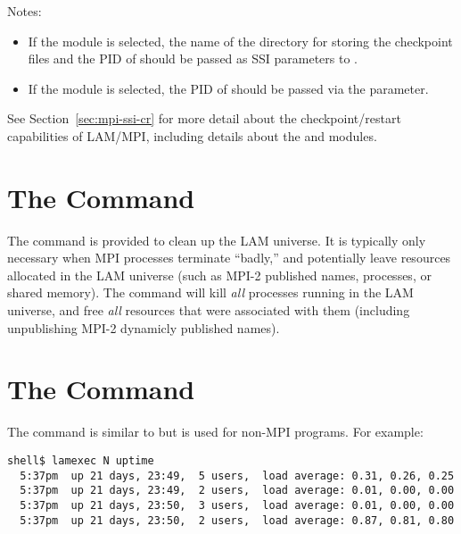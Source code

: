 \noindent Notes:

\begin{itemize}
\item If the   module is selected, the name of
  the directory for storing the checkpoint files and the PID of
   should be passed as SSI parameters to
  .
  
\item If the   module is selected, the PID of
   should be passed via the  parameter.
\end{itemize}


See Section~\ref{sec:mpi-ssi-cr} for more detail about the
checkpoint/restart capabilities of LAM/MPI, including details about
the  and   modules.


\section{The  Command}
\label{sec:commands-lamclean}

The  command is provided to clean up the LAM universe.
It is typically only necessary when MPI processes terminate ``badly,''
and potentially leave resources allocated in the LAM universe (such as
MPI-2 published names, processes, or shared memory).  The
 command will kill {\em all} processes running in the
LAM universe, and free {\em all} resources that were associated with
them (including unpublishing MPI-2 dynamicly published names).


\section{The  Command}
\label{sec:commands-lamexec}

The  command is similar to  but is used for
non-MPI programs.  For example:

\lstset{style=lam-cmdline}
\begin{lstlisting}
shell$ lamexec N uptime
  5:37pm  up 21 days, 23:49,  5 users,  load average: 0.31, 0.26, 0.25
  5:37pm  up 21 days, 23:49,  2 users,  load average: 0.01, 0.00, 0.00
  5:37pm  up 21 days, 23:50,  3 users,  load average: 0.01, 0.00, 0.00
  5:37pm  up 21 days, 23:50,  2 users,  load average: 0.87, 0.81, 0.80
\end{lstlisting}

